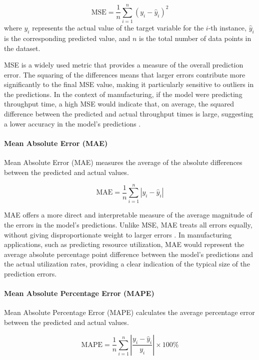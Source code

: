 \begin{equation}
  \text{MSE} = \frac{1}{n} \sum_{i=1}^{n} (y_i - \hat{y}_i)^2
\end{equation}
where $y_i$ represents the actual value of the target variable for the $i$-th instance, $\hat{y}_i$ is the corresponding predicted value, and $n$ is the total number of data points in the dataset.

MSE is a widely used metric that provides a measure of the overall prediction error. The squaring of the differences means that larger errors contribute more significantly to the final MSE value, making it particularly sensitive to outliers in the predictions. In the context of manufacturing, if the model were predicting throughput time, a high MSE would indicate that, on average, the squared difference between the predicted and actual throughput times is large, suggesting a lower accuracy in the model's predictions \autocite{fahrmeir2016statistik}.

\paragraph{\textbf{Mean Absolute Error (MAE)}}
Mean Absolute Error (MAE) measures the average of the absolute differences between the predicted and actual values.

\begin{equation}
  \text{MAE} = \frac{1}{n} \sum_{i=1}^{n} |y_i - \hat{y}_i|
\end{equation}

MAE offers a more direct and interpretable measure of the average magnitude of the errors in the model's predictions. Unlike MSE, MAE treats all errors equally, without giving disproportionate weight to larger errors \autocite{fahrmeir2016statistik}. In manufacturing applications, such as predicting resource utilization, MAE would represent the average absolute percentage point difference between the model's predictions and the actual utilization rates, providing a clear indication of the typical size of the prediction errors.

\paragraph{\textbf{Mean Absolute Percentage Error (MAPE)}}
Mean Absolute Percentage Error (MAPE) calculates the average percentage error between the predicted and actual values.

\begin{equation}
  \text{MAPE} = \frac{1}{n} \sum_{i=1}^{n} \left| \frac{y_i - \hat{y}_i}{y_i} \right| \times 100\%
\end{equation}

